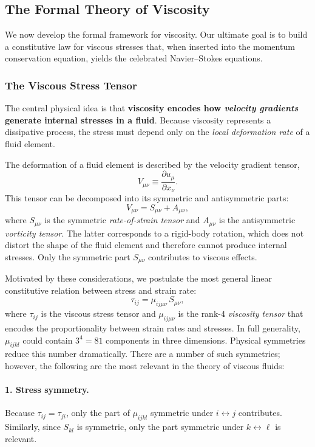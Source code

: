 \subsection{The Formal Theory of Viscosity}

We now develop the formal framework for viscosity. Our ultimate goal is
to build a constitutive law for viscous stresses that, when inserted into
the momentum conservation equation, yields the celebrated
Navier--Stokes equations.

\subsubsection*{The Viscous Stress Tensor}

The central physical idea is that \textbf{viscosity encodes how
\emph{velocity gradients} generate internal stresses in a fluid}.
Because viscosity represents a dissipative process, the stress must
depend only on the \emph{local deformation rate} of a fluid element.

The deformation of a fluid element is described by the velocity gradient
tensor,
\[
V_{\mu\nu} \equiv \frac{\partial u_\mu}{\partial x_\nu}.
\]
This tensor can be decomposed into its symmetric and antisymmetric
parts:
\[
V_{\mu\nu} = S_{\mu\nu} + A_{\mu\nu},
\]
where $S_{\mu\nu}$ is the symmetric \emph{rate-of-strain tensor} and
$A_{\mu\nu}$ is the antisymmetric \emph{vorticity tensor}. The latter
corresponds to a rigid-body rotation, which does not distort the shape
of the fluid element and therefore cannot produce internal stresses.
Only the symmetric part $S_{\mu\nu}$ contributes to viscous effects.

Motivated by these considerations, we postulate the most general linear
constitutive relation between stress and strain rate:
\[
\tau_{ij} = \mu_{ij\mu\nu}\,S_{\mu\nu},
\]
where $\tau_{ij}$ is the viscous stress tensor and
$\mu_{ij\mu\nu}$ is the rank-4 \emph{viscosity tensor} that encodes the
proportionality between strain rates and stresses. In full generality, $\mu_{ijkl}$ could contain $3^4=81$ components in three dimensions. Physical symmetries reduce this number dramatically. There are a number of such symmetries; however, the following are the most relevant in the theory of viscous fluids:
\vspace{0.5cm}
\paragraph{1. Stress symmetry.}
Because $\tau_{ij} = \tau_{ji}$, only the part of $\mu_{ijkl}$ symmetric under $i \leftrightarrow j$ contributes. Similarly, since $S_{kl}$ is symmetric, only the part symmetric under $k \leftrightarrow \ell$ is relevant.

